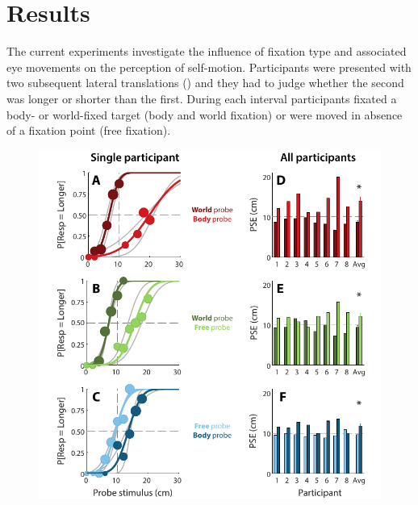 
\section{Results}

The current experiments investigate the influence of fixation type and associated eye movements on the perception of self-motion. Participants were presented with two subsequent lateral translations () and they had to judge whether the second was longer or shorter than the first. During each interval participants fixated a body- or world-fixed target (body and world fixation) or were moved in absence of a fixation point (free fixation).

\begin{figure}
    \includegraphics[width=1.0\textwidth]{src/paper3/figure2.pdf}


\end{figure}
